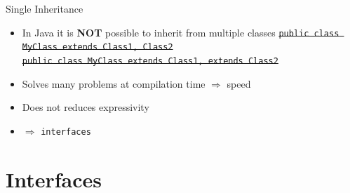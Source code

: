 \documentclass[English,c,%
hyperref={%
    pdftitle={FISA-DE2 Java Inheritance},%
    pdfauthor={Muller, Gravier, Laforest, Subercaze},%
    pdfsubject={Java Inheritance},%
    pdfkeywords={Inheritance, Java},%
    colorlinks=true,%
    urlcolor=blue,%
    linkcolor=%
    },%
xcolor={pdftex,svgnames} %
]{beamer}
\begin{document}
\begin{frame}{Single Inheritance}

  \begin{itemize}
    \item In Java it is \textbf{NOT} possible to inherit from multiple classes
    \sout{\texttt{public class MyClass extends Class1, Class2}} \\
    \sout{\texttt{public class MyClass extends Class1, extends Class2}}
    \item Solves many problems at compilation time $\Rightarrow$ speed
    \item Does not reduces expressivity
    \bigskip
    \item $\Rightarrow$ \texttt{interfaces}
  \end{itemize}
\end{frame}


\section{Interfaces}
\end{document}
